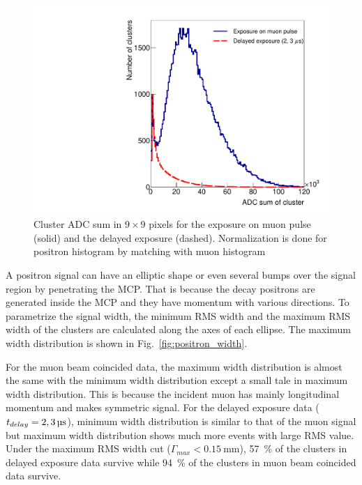 \documentclass[preprint,3p,twocolumn]{elsarticle}
\begin{document}
\begin{figure}[tbp]
	\centering
	\includegraphics[width=\columnwidth]{figure/Integ_legend_v2.pdf}
	\caption{Cluster ADC sum in $9\times9$ pixels for the exposure on muon pulse (solid) and the delayed exposure (dashed).
		Normalization is done for positron histogram by matching with muon histogram}
	\vspace{-0.2cm}
	\label{fig:BPM_int}
\end{figure}

A positron signal can have an elliptic shape or even several bumps over the signal region by penetrating the MCP. That is because the decay positrons are generated inside the MCP and they have momentum with various directions. 
To parametrize the signal width, the minimum RMS width and the maximum RMS width of the clusters are calculated along the axes of each ellipse. The maximum width distribution is shown in Fig.~\ref{fig:positron_width}.

For the muon beam coincided data, the maximum width distribution is almost the same with the minimum width distribution except a small tale in maximum width distribution. This is because the incident muon has mainly longitudinal momentum and makes symmetric signal.
For the delayed exposure data
($t_{delay} = \SIlist[list-pair-separator = {, }, list-units = single]{2; 3}{\micro\s}$),
minimum width distribution is similar to that of the muon signal but maximum width distribution shows much more events with large RMS value. Under the maximum RMS width cut
($\Gamma_{max} < \SI{0.15}{\mm}$),
\SI{57}{\percent} of the clusters in delayed exposure data survive while \SI{94}{\percent} of the clusters in muon beam coincided data survive.
\end{document}
